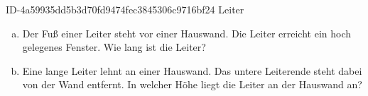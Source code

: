 \begin{exercise}
      {ID-4a59935dd5b3d70fd9474fec3845306c9716bf24}
      {Leiter}
  \ifproblem\problem
    \begin{enumerate}[a)]
      \item Der Fuß einer Leiter steht  vor einer Hauswand. Die Leiter
            erreicht ein  hoch gelegenes Fenster. Wie lang ist die Leiter?
      \item Eine  lange Leiter lehnt an einer Hauswand. Das untere
            Leiterende steht dabei  von der Wand entfernt. In welcher
            Höhe liegt die Leiter an der Hauswand an?
    \end{enumerate}
  \fi
\end{exercise}
